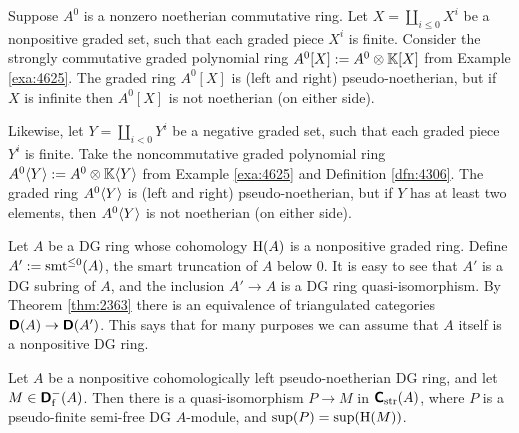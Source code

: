 \begin{exa} \label{exa:3182}
Suppose $A^0$ is a nonzero noetherian commutative ring.
Let $X = \coprod_{i \leq 0} X^i$ be a 
nonpositive graded set, such that each graded piece $X^i$ is finite. 
Consider the strongly commutative graded polynomial ring
$A^0[X] := A^0 \otimes \mathbb{K} [X]$
from Example \ref{exa:4625}.
The graded ring $A^0[X]$ is (left and right) pseudo-noetherian, but if $X$ is 
infinite then $A^0[X]$ is not noetherian (on either side).  

Likewise, let $Y = \coprod_{i < 0} Y^i$ be a negative graded set, such that 
each graded piece $Y^i$ is finite. Take the noncommutative graded 
polynomial ring
$A^0 \langle Y \rangle := A^0 \otimes \mathbb{K} \langle Y \rangle$
from Example \ref{exa:4625} and Definition \ref{dfn:4306}. 
The graded ring $A^0\langle Y \rangle$ is (left and right) pseudo-noetherian, but if $Y$ 
has at least two elements, then $A^0\langle Y \rangle$ is not noetherian (on either side).
\end{exa}

\begin{rem} \label{rem:3205}
Let $A$ be a DG ring whose cohomology $\operatorname{H}(A)$ is a nonpositive graded 
ring. Define $A' := \operatorname{smt}^{\leq 0}(A)$, the smart truncation of 
$A$ below $0$. It is easy to see that $A'$ is 
a DG subring of $A$, and the inclusion $A' \to A$ is a DG ring 
quasi-isomorphism. By Theorem \ref{thm:2363} there is an equivalence of 
triangulated categories $\boldsymbol{\mathsf{D}}(A) \to \boldsymbol{\mathsf{D}}(A')$. 
This says that for many purposes we can assume that $A$ itself is a 
nonpositive DG ring. 
\end{rem}

\begin{thm} \label{thm:3340}
Let $A$ be a nonpositive cohomologically left pseudo-noether\-ian DG ring, and 
let $M \in \boldsymbol{\mathsf{D}}_{\mathrm{f}}^{-}(A)$. 
Then there is a quasi-isomorphism 
$P \to M$ in $\boldsymbol{\mathsf{C}}_{\mathrm{str}}(A)$, where $P$ is a pseudo-finite 
semi-free DG $A$-module, and $\operatorname{sup}(P) = \operatorname{sup}(\operatorname{H}(M))$. 
\end{thm}


